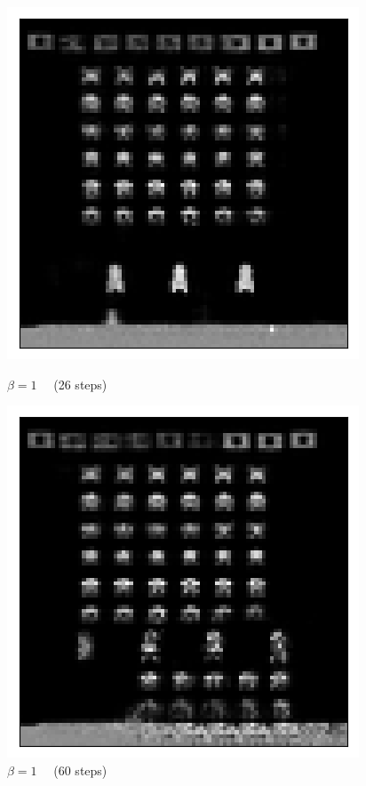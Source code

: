 \begin{figure}[h!]
\begin{multicols}{4}
    \includegraphics[scale=0.4]{figures/results/indiscriminate_decoupling/beta_1_posterior_sample_26.png}
    \caption{$\beta=1\quad$ (26 steps)}
    \includegraphics[scale=0.4]{figures/results/indiscriminate_decoupling/beta_1_posterior_sample_60.png}
    \caption{$\beta=1\quad$ (60 steps)}
\end{multicols}


\end{figure}
